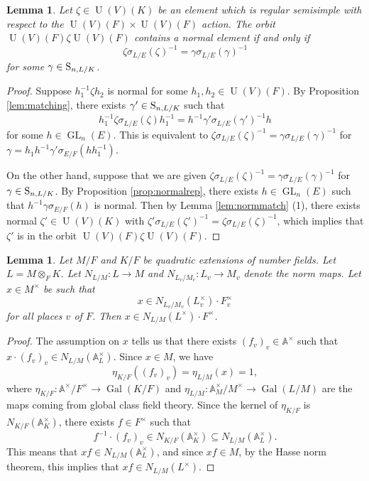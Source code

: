 \documentclass[11pt, reqno]{amsart}
\numberwithin{equation}{subsection}
\theoremstyle{plain}
\newtheorem{lem}[proposition]{Lemma}
\theoremstyle{definition}
\renewcommand{\AA}{\mathbb A}
\renewcommand{\S}{\textnormal{S}}
\DeclareMathOperator{\Gal}{Gal}
\DeclareMathOperator{\GL}{GL}
\DeclareMathOperator{\U}{U}
\begin{document}
\begin{lem}
\label{lem:unitarynormalexistence}
Let $\zeta \in \U(V)(K)$ be an element which
is regular semisimple with respect to the 
$\U(V)(F) \times \U(V)(F)$ action. The orbit
$\U(V)(F) \zeta \U(V)(F)$ contains a normal element if and
only if
\[
    \zeta\sigma_{L/E}(\zeta)^{-1}
    = \gamma\sigma_{L/E}(\gamma)^{-1}
\]
for some $\gamma \in \S_{n, L/K}$.
\end{lem}
\begin{proof}
Suppose $h_1^{-1} \zeta h_2$ is normal for some
$h_1, h_2 \in \U(V)(F)$. By
Proposition \ref{lem:matching}, there exists
$\gamma' \in \S_{n, L/K}$ such that
\[
    h_1^{-1}\zeta\sigma_{L/E}(\zeta) h_1^{-1}
    = h^{-1}\gamma'\sigma_{L/E}(\gamma')^{-1} h
\]
for some $h \in \GL_n(E)$.
This is equivalent to $\zeta\sigma_{L/E}(\zeta)^{-1}
= \gamma\sigma_{L/E}(\gamma)^{-1}$ for
$\gamma = h_1 h^{-1}\gamma' \sigma_{E/F}(h h_1^{-1})$.

On the other hand, suppose that we are given
$\zeta\sigma_{L/E}(\zeta)^{-1} =
\gamma\sigma_{L/E}(\gamma)^{-1}$ for $\gamma
\in \S_{n, L/K}$. 
By Proposition \ref{prop:normalrep}, there exists
$h \in \GL_n(E)$ such that $h^{-1}\gamma
\sigma_{E/F}(h)$ is normal. 
Then by Lemma \ref{lem:normmatch} (1), there exists
normal $\zeta' \in \U(V)(K)$ with
$\zeta'\sigma_{L/E}(\zeta')^{-1}
= \zeta\sigma_{L/E}(\zeta)^{-1}$, which implies
that $\zeta'$ is in the orbit $\U(V)(F)\zeta \U(V)(F)$.
\end{proof}


\begin{lem}
\label{lem:normtimesF}
Let $M/F$ and $K/F$ be quadratic extensions of number
fields. Let $L = M \otimes_F K$.
Let $N_{L/M} \colon L \to M$ and
$N_{L_v/M_v} \colon L_v \to M_v$ denote the norm maps. 
Let $x \in M^\times$ be such that
\[
    x \in N_{L_v/M_v}(L_v^\times) \cdot F_v^\times
\]
for all places $v$ of $F$. Then
$x \in N_{L/M}(L^\times)\cdot F^\times$.
\end{lem}
\begin{proof}
The assumption on $x$ tells us that there exists
$(f_v)_v \in \AA^\times$ such that
$x \cdot (f_v)_v \in N_{L/M}(\AA_L^\times)$.
Since $x \in M$, we have
\[
    \eta_{K/F}((f_v)_v) = \eta_{L/M}(x) = 1,
\]
where $\eta_{K/F} \colon \AA^\times/F^\times
\to \Gal(K/F)$ and
$\eta_{L/M} \colon \AA_M^\times/M^\times
\to \Gal(L/M)$
are the maps coming from global class field theory.
Since the kernel of $\eta_{K/F}$ is 
$N_{K/F}(\AA_K^\times)$,
there exists $f \in F^\times$ such that
\[
    f^{-1} \cdot (f_v)_v \in N_{K/F}(\AA_K^\times)
    \subseteq N_{L/M}(\AA_L^\times).
\]
This means that $xf \in N_{L/M}(\AA_L^\times)$,
and since $xf \in M$, by the Hasse norm
theorem, this implies that $xf \in N_{L/M}(L^\times)$.
\end{proof}
\end{document}
